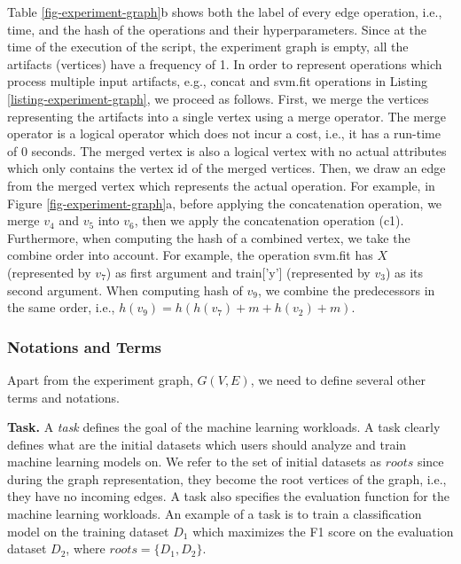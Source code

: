 Table \ref{fig-experiment-graph}b shows both the label of every edge operation, i.e., time, and the hash of the operations and their hyperparameters.
Since at the time of the execution of the script, the experiment graph is empty, all the artifacts (vertices) have a frequency of 1.
In order to represent operations which process multiple input artifacts, e.g., concat and svm.fit operations in Listing \ref{listing-experiment-graph}, we proceed as follows.
First, we merge the vertices representing the artifacts into a single vertex using a merge operator.
The merge operator is a logical operator which does not incur a cost, i.e., it has a run-time of 0 seconds.
The merged vertex is also a logical vertex with no actual attributes which only contains the vertex id of the merged vertices.
Then, we draw an edge from the merged vertex which represents the actual operation.
For example, in Figure \ref{fig-experiment-graph}a, before applying the concatenation operation, we merge $v_4$ and $v_5$ into $v_6$, then we apply the concatenation operation (c1).
Furthermore, when computing the hash of a combined vertex, we take the combine order into account.
For example, the operation svm.fit has $X$ (represented by $v_7$) as first argument and train['y'] (represented by $v_3$) as its second argument.
When computing hash of $v_9$, we combine the predecessors in the same order, i.e., $h(v_9) = h(h(v_7) + m + h(v_2) + m)$. 

\subsubsection{Notations and Terms}\label{notations-terms}
Apart from the experiment graph, $G(V, E)$, we need to define several other terms and notations.

\textbf{Task.} A \textit{task} defines the goal of the machine learning workloads. 
A task clearly defines what are the initial datasets which users should analyze and train machine learning models on. 
We refer to the set of initial datasets as $roots$ since during the graph representation, they become the root vertices of the graph, i.e., they have no incoming edges.
A task also specifies the evaluation function for the machine learning workloads.
An example of a task is to train a classification model on the training dataset $D_1$ which maximizes the F1 score on the evaluation dataset $D_2$, where $roots = \{D_1, D_2\}$.


